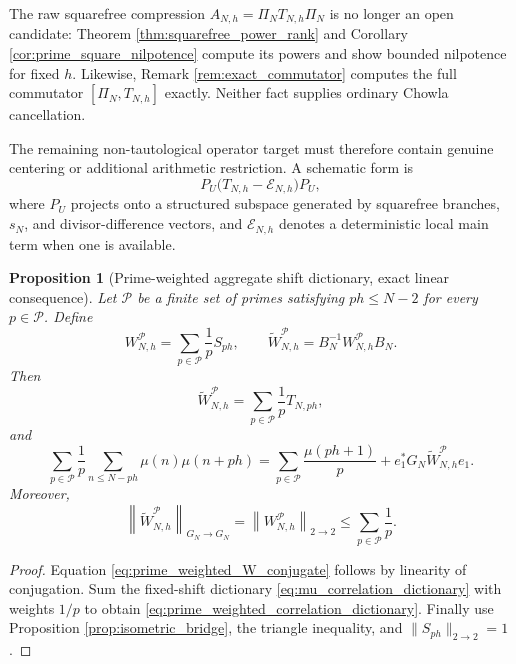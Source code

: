 \documentclass[11pt]{amsart}
\numberwithin{equation}{section}
\theoremstyle{plain}
\newtheorem{proposition}[theorem]{Proposition}
\theoremstyle{definition}
\theoremstyle{remark}
\newcommand{\mob}{\mu}
\begin{document}
The raw squarefree compression $A_{N,h}=\Pi_NT_{N,h}\Pi_N$ is no longer an open candidate: Theorem \ref{thm:squarefree_power_rank} and Corollary \ref{cor:prime_square_nilpotence} compute its powers and show bounded nilpotence for fixed $h$.  Likewise, Remark \ref{rem:exact_commutator} computes the full commutator $[\Pi_N,T_{N,h}]$ exactly.  Neither fact supplies ordinary Chowla cancellation.

The remaining non-tautological operator target must therefore contain genuine centering or additional arithmetic restriction.  A schematic form is
\begin{equation}
P_U\bigl(T_{N,h}-\mathcal E_{N,h}\bigr)P_U,
\label{eq:centered_compression_template}
\end{equation}
where $P_U$ projects onto a structured subspace generated by squarefree branches, $s_N$, and divisor-difference vectors, and $\mathcal E_{N,h}$ denotes a deterministic local main term when one is available.

\begin{proposition}[Prime-weighted aggregate shift dictionary, exact linear consequence]
\label{prop:prime_weighted_shift}
Let $\mathcal P$ be a finite set of primes satisfying $ph\le N-2$ for every $p\in\mathcal P$.  Define
\begin{equation}
W_{N,h}^{\mathcal P}
=\sum_{p\in\mathcal P}\frac1pS_{ph},
\qquad
\widetilde W_{N,h}^{\mathcal P}
=B_N^{-1}W_{N,h}^{\mathcal P}B_N.
\label{eq:prime_weighted_W_definition}
\end{equation}
Then
\begin{equation}
\widetilde W_{N,h}^{\mathcal P}
=\sum_{p\in\mathcal P}\frac1pT_{N,ph},
\label{eq:prime_weighted_W_conjugate}
\end{equation}
and
\begin{equation}
\boxed{
\sum_{p\in\mathcal P}\frac1p
\sum_{n\le N-ph}\mob(n)\mob(n+ph)
=
\sum_{p\in\mathcal P}\frac{\mob(ph+1)}p
+e_1^*G_N\widetilde W_{N,h}^{\mathcal P}e_1.}
\label{eq:prime_weighted_correlation_dictionary}
\end{equation}
Moreover,
\begin{equation}
\left\|\widetilde W_{N,h}^{\mathcal P}\right\|_{G_N\to G_N}
=\left\|W_{N,h}^{\mathcal P}\right\|_{2\to2}
\le\sum_{p\in\mathcal P}\frac1p.
\label{eq:prime_weighted_norm_bound}
\end{equation}
\end{proposition}

\begin{proof}
Equation \eqref{eq:prime_weighted_W_conjugate} follows by linearity of conjugation.  Sum the fixed-shift dictionary \eqref{eq:mu_correlation_dictionary} with weights $1/p$ to obtain \eqref{eq:prime_weighted_correlation_dictionary}.  Finally use Proposition \ref{prop:isometric_bridge}, the triangle inequality, and $\|S_{ph}\|_{2\to2}=1$.
\end{proof}
\end{document}
